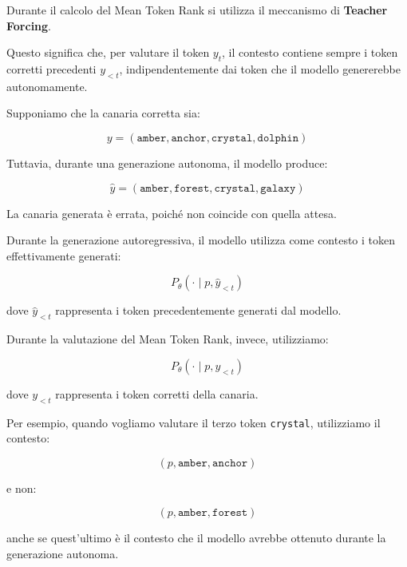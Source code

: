 Durante il calcolo del Mean Token Rank si utilizza il meccanismo di \textbf{Teacher Forcing}.

Questo significa che, per valutare il token $y_t$, il contesto contiene sempre i token corretti precedenti $y_{<t}$, indipendentemente dai token che il modello genererebbe autonomamente.

Supponiamo che la canaria corretta sia:

\[
y=(\texttt{amber},\texttt{anchor},
\texttt{crystal},\texttt{dolphin})
\]

Tuttavia, durante una generazione autonoma, il modello produce:

\[
\hat{y}=(\texttt{amber},\texttt{forest},
\texttt{crystal},\texttt{galaxy})
\]

La canaria generata è errata, poiché non coincide con quella attesa.

Durante la generazione autoregressiva, il modello utilizza come contesto i token effettivamente generati:

\[
P_\theta(\cdot\mid p,\hat{y}_{<t})
\]

dove $\hat{y}_{<t}$ rappresenta i token precedentemente generati dal modello.

Durante la valutazione del Mean Token Rank, invece, utilizziamo:

\[
P_\theta(\cdot\mid p,y_{<t})
\]

dove $y_{<t}$ rappresenta i token corretti della canaria.

Per esempio, quando vogliamo valutare il terzo token \texttt{crystal}, utilizziamo il contesto:

\[
(p,\texttt{amber},\texttt{anchor})
\]

e non:

\[
(p,\texttt{amber},\texttt{forest})
\]

anche se quest'ultimo è il contesto che il modello avrebbe ottenuto durante la generazione autonoma.

